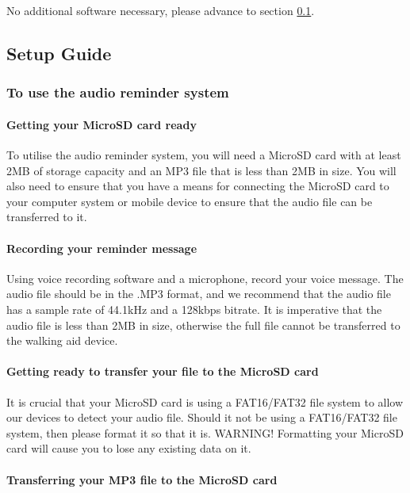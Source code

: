 			No additional software necessary, please advance to section \ref{subsec:quick_start_setup_guide}.

		\subsection{Setup Guide}
		\label{subsec:quick_start_setup_guide}

			\subsubsection{To use the audio reminder system}

				\paragraph{Getting your MicroSD card ready}\mbox{}

				To utilise the audio reminder system, you will need a MicroSD card with at least 2MB of storage capacity and an MP3 file that is less than 2MB in size. You will also need to ensure that you have a means for connecting the MicroSD card to your computer system or mobile device to ensure that the audio file can be transferred to it.

				\paragraph{Recording your reminder message}\mbox{}

				Using voice recording software and a microphone, record your voice message. The audio file should be in the .MP3 format, and we recommend that the audio file has a sample rate of 44.1kHz and a 128kbps bitrate. It is imperative that the audio file is less than 2MB in size, otherwise the full file cannot be transferred to the walking aid device.

				\paragraph{Getting ready to transfer your file to the MicroSD card}\mbox{}

				It is crucial that your MicroSD card is using a FAT16/FAT32 file system to allow our devices to detect your audio file. Should it not be using a FAT16/FAT32 file system, then please format it so that it is. WARNING! Formatting your MicroSD card will cause you to lose any existing data on it.

				\paragraph{Transferring your MP3 file to the MicroSD card}\mbox{}

